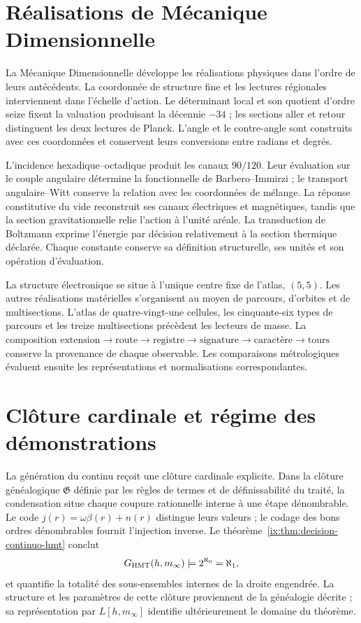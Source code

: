\section*{Réalisations de Mécanique Dimensionnelle}

La Mécanique Dimensionnelle développe les réalisations physiques dans l’ordre de leurs antécédents. La coordonnée de structure fine et les lectures régionales interviennent dans l’échelle d’action. Le déterminant local et son quotient d’ordre seize fixent la valuation produisant la décennie \(-34\) ; les sections aller et retour distinguent les deux lectures de Planck. L’angle et le contre-angle sont construits avec ces coordonnées et conservent leurs conversions entre radians et degrés.

L’incidence hexadique--octadique produit les canaux \(90/120\). Leur évaluation sur le couple angulaire détermine la fonctionnelle de Barbero--Immirzi ; le transport angulaire--Witt conserve la relation avec les coordonnées de mélange. La réponse constitutive du vide reconstruit ses canaux électriques et magnétiques, tandis que la section gravitationnelle relie l’action à l’unité aréale. La transduction de Boltzmann exprime l’énergie par décision relativement à la section thermique déclarée. Chaque constante conserve sa définition structurelle, ses unités et son opération d’évaluation.

La structure électronique se situe à l’unique centre fixe de l’atlas, \((5,5)\). Les autres réalisations matérielles s’organisent au moyen de parcours, d’orbites et de multisections. L’atlas de quatre-vingt-une cellules, les cinquante-six types de parcours et les treize multisections précèdent les lecteurs de masse. La composition \(\text{extension}\to\text{route}\to\text{registre}\to
\text{signature}\to\text{caractère}\to\text{tours}\) conserve la provenance de chaque observable. Les comparaisons métrologiques évaluent ensuite les représentations et normalisations correspondantes.

\section*{Clôture cardinale et régime des démonstrations}

La génération du continu reçoit une clôture cardinale explicite. Dans la clôture généalogique \(\mathfrak G\) définie par les règles de termes et de définissabilité du traité, la condensation situe chaque coupure rationnelle interne à une étape dénombrable. Le code \(j(r)=\omega\beta(r)+n(r)\) distingue leurs valeurs ; le codage des bons ordres dénombrables fournit l’injection inverse. Le théorème~\ref{ix:thm:decision-continuo-hmt} conclut
\[
 \mathfrak G_{\rm HMT}(h,m_\infty)
 \models 2^{\aleph_0}=\aleph_1,
\]
et quantifie la totalité des sous-ensembles internes de la droite engendrée. La structure et les paramètres de cette clôture proviennent de la généalogie décrite ; sa représentation par \(L[h,m_\infty]\) identifie ultérieurement le domaine du théorème.

